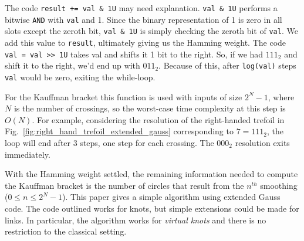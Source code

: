 \documentclass{article}
\theoremstyle{plain}
\begin{document}
        The code \texttt{result += val \& 1U} may need explanation.
        \texttt{val \& 1U} performs a bitwise \texttt{AND} with \texttt{val} and
        1. Since the binary representation of 1 is zero in all slots except the
        zeroth bit, \texttt{val \& 1U} is simply checking the zeroth bit of
        \texttt{val}. We add this value to \texttt{result}, ultimately giving
        us the Hamming weight. The code \texttt{val = val >> 1U} takes val and
        shifts it 1 bit to the right. So, if we had $111_{2}$ and shift it to
        the right, we'd end up with $011_{2}$. Because of this, after
        \texttt{log(val)} steps \texttt{val} would be zero, exiting the
        while-loop.
        \par\hfill\par
        For the Kauffman bracket this function is used with inputs of size
        $2^{N}-1$, where $N$ is the number of crossings, so the worst-case
        time complexity at this step is $O(N)$. For example, considering the
        resolution of the right-handed trefoil
        in Fig.~\ref{fig:right_hand_trefoil_extended_gauss} corresponding to
        $7=111_{2}$, the loop will end after 3 steps, one step for each
        crossing. The $000_{2}$ resolution exits immediately.
        \par\hfill\par
        With the Hamming weight settled, the remaining information needed to
        compute the Kauffman bracket is the number of circles that result from
        the $n^{th}$ smoothing ($0\leq{n}\leq{2}^{N}-1$). This paper gives a
        simple algorithm using extended Gauss code. The code outlined works for
        knots, but simple extensions could be made for links. In particular, the
        algorithm works for \textit{virtual knots} and there is no restriction
        to the classical setting.
\end{document}
